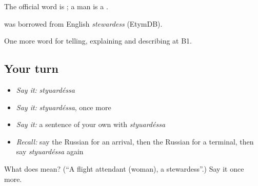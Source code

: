 The official word is \emph{}; a man is a \emph{}.

\begin{cousinweb}
\emph{} was borrowed from English \emph{stewardess} (EtymDB).
\end{cousinweb}

\begin{grammarlens}[title={What you've built}]
One more word for telling, explaining and describing at B1.
\end{grammarlens}

\subsection*{Your turn}
\begin{itemize}
\raggedright
  \item \emph{Say it:} \emph{styuardéssa}
  \item \emph{Say it:} \emph{styuardéssa}, once more
  \item \emph{Say it:} a sentence of your own with \emph{styuardéssa}
  \item \emph{Recall:} say the Russian for an arrival, then the Russian for a terminal, then say \emph{styuardéssa} again
\end{itemize}

\begin{tcolorbox}[breakable,colback=teal!4,colframe=teal!35!black,title={Before you move on}]
What does  mean? (\textquotedblleft{}A flight attendant (woman), a stewardess\textquotedblright{}.) Say it once more.
\end{tcolorbox}

